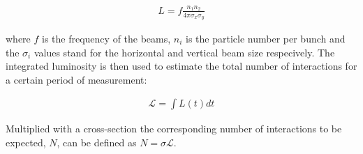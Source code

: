 \begin{align}
L =f \frac{n_1 n_2}{4 \pi \sigma_x \sigma_y}
\end{align}

where $f$ is the frequency of the beams, $n_i$ is the particle number per bunch and the $\sigma_i$ values stand for the horizontal and vertical beam size respecively.
The integrated luminosity is then used to estimate the total number of interactions for a certain period of measurement:

\begin{align}
\mathcal{L} = \int L(t) dt
\end{align}

Multiplied with a cross-section the corresponding number of interactions to be expected, $N$, can be defined as $N = \sigma \mathcal{L}$.


